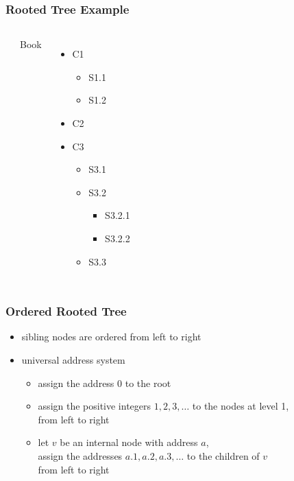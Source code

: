 \documentclass[dvipsnames]{beamer}
\begin{document}
\begin{frame}
  \frametitle{Rooted Tree Example}

  \begin{example}
    \begin{columns}
      \begin{center}
      \end{center}

      \pause
      Book
      \begin{itemize}
        \item C1
        \begin{itemize}
          \item S1.1
          \item S1.2
        \end{itemize}
        \item C2
        \item C3
        \begin{itemize}
          \item S3.1
          \item S3.2
          \begin{itemize}
            \item S3.2.1
            \item S3.2.2
          \end{itemize}
          \item S3.3
        \end{itemize}
      \end{itemize}
    \end{columns}
  \end{example}
\end{frame}

\begin{frame}
  \frametitle{Ordered Rooted Tree}

  \begin{itemize}
    \item sibling nodes are ordered from left to right

    \pause
    \medskip
    \item \alert{universal address system}
    \begin{itemize}
      \item assign the address $0$ to the root
      \item assign the positive integers $1,2,3,\dots$ to the nodes at level 1,\\
        from left to right
      \item let $v$ be an internal node with address $a$,\\
        assign the addresses $a.1,a.2,a.3,\dots$ to the children of $v$\\
        from left to right
    \end{itemize}
  \end{itemize}
\end{frame}
\end{document}

